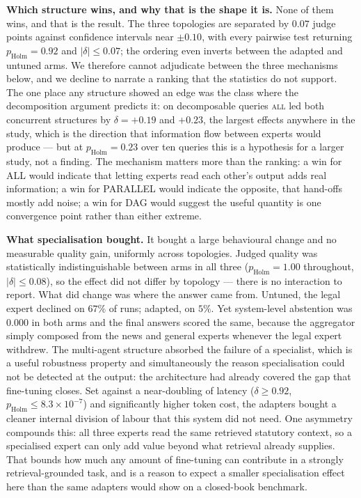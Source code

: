 \documentclass[journal,10pt,compsoc,onecolumn]{IEEEtran}
\begin{document}
\textbf{Which structure wins, and why that is the shape it is.}
None of them wins, and that is the result. The three topologies are separated by
$0.07$ judge points against confidence intervals near $\pm 0.10$, with every
pairwise test returning $p_{\text{Holm}} = 0.92$ and $|\delta| \leq 0.07$; the
ordering even inverts between the adapted and untuned arms. We therefore cannot
adjudicate between the three mechanisms below, and we decline to narrate a
ranking that the statistics do not support. The one place any structure showed
an edge was the class where the decomposition argument predicts it: on
decomposable queries \textsc{all} led both concurrent structures by
$\delta = +0.19$ and $+0.23$, the largest effects anywhere in the study, which
is the direction that information flow between experts would produce --- but at
$p_{\text{Holm}} = 0.23$ over ten queries this is a hypothesis for a larger
study, not a finding. The mechanism matters
more than the ranking: a win for ALL would indicate that letting experts read
each other's output adds real information; a win for PARALLEL would indicate the
opposite, that hand-offs mostly add noise; a win for DAG would suggest the useful
quantity is one convergence point rather than either extreme.

\textbf{What specialisation bought.} It bought a large behavioural change and no
measurable quality gain, uniformly across topologies. Judged quality was
statistically indistinguishable between arms in all three
($p_{\text{Holm}} = 1.00$ throughout, $|\delta| \leq 0.08$), so the effect did
not differ by topology --- there is no interaction to report. What did change
was where the answer came from. Untuned, the legal expert declined on $67\%$ of
runs; adapted, on $5\%$. Yet system-level abstention was $0.000$ in both arms
and the final answers scored the same, because the aggregator simply composed
from the news and general experts whenever the legal expert withdrew. The
multi-agent structure absorbed the failure of a specialist, which is a useful
robustness property and simultaneously the reason specialisation could not be
detected at the output: the architecture had already covered the gap that
fine-tuning closes. Set against a near-doubling of latency
($\delta \geq 0.92$, $p_{\text{Holm}} \leq 8.3\times10^{-7}$) and significantly
higher token cost, the adapters bought a cleaner internal division of labour
that this system did not need. One asymmetry compounds this:
all three experts read the same retrieved statutory context, so a specialised
expert can only add value beyond what retrieval already supplies. That bounds how
much any amount of fine-tuning can contribute in a strongly retrieval-grounded
task, and is a reason to expect a smaller specialisation effect here than the same
adapters would show on a closed-book benchmark.
\end{document}
